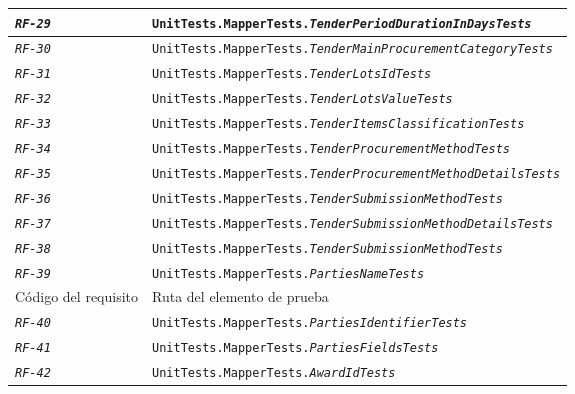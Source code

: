 \begin{longtable}{|| M{3cm} | M{12cm} ||}
                \hline
                    \texttt{\textit{RF-29}} & \texttt{UnitTests.MapperTests.\textit{TenderPeriodDurationInDaysTests}} \\
                \hline
                    \texttt{\textit{RF-30}} & \texttt{UnitTests.MapperTests.\textit{TenderMainProcurementCategoryTests}} \\
                \hline
                    \texttt{\textit{RF-31}} & \texttt{UnitTests.MapperTests.\textit{TenderLotsIdTests}} \\
                \hline
                    \texttt{\textit{RF-32}} & \texttt{UnitTests.MapperTests.\textit{TenderLotsValueTests}} \\
                \hline
                    \texttt{\textit{RF-33}} & \texttt{UnitTests.MapperTests.\textit{TenderItemsClassificationTests}} \\
                \hline
                    \texttt{\textit{RF-34}} & \texttt{UnitTests.MapperTests.\textit{TenderProcurementMethodTests}} \\
                \hline
                    \texttt{\textit{RF-35}} & \texttt{UnitTests.MapperTests.\textit{TenderProcurementMethodDetailsTests}} \\
                \hline
                    \texttt{\textit{RF-36}} & \texttt{UnitTests.MapperTests.\textit{TenderSubmissionMethodTests}} \\
                \hline
                    \texttt{\textit{RF-37}} & \texttt{UnitTests.MapperTests.\textit{TenderSubmissionMethodDetailsTests}} \\
                \hline
                    \texttt{\textit{RF-38}} & \texttt{UnitTests.MapperTests.\textit{TenderSubmissionMethodTests}} \\
                \hline
                    \texttt{\textit{RF-39}} & \texttt{UnitTests.MapperTests.\textit{PartiesNameTests}} \\
                \hline
                    Código del requisito & Ruta del elemento de prueba \\
                \hline
                \hline
                    \texttt{\textit{RF-40}} & \texttt{UnitTests.MapperTests.\textit{PartiesIdentifierTests}} \\
                \hline
                    \texttt{\textit{RF-41}} & \texttt{UnitTests.MapperTests.\textit{PartiesFieldsTests}} \\
                \hline
                    \texttt{\textit{RF-42}} & \texttt{UnitTests.MapperTests.\textit{AwardIdTests}} \\

\end{longtable}
